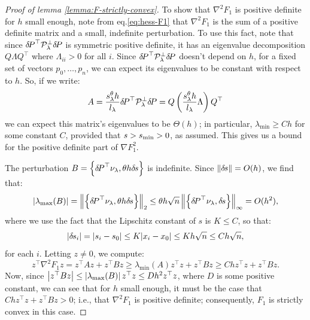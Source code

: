 \documentclass[smallcondensed]{svjour3}
\begin{document}
\begin{proof}[Proof of lemma \ref{lemma:F-strictly-convex}]
  To show that $\nabla^2 F_1$ is positive definite for $h$ small
  enough, note from eq.\@ \ref{eq:hess-F1} that $\nabla^2 F_1$ is
  the sum of a positive definite matrix and a small, indefinite
  perturbation. To use this fact, note that since
  ${\delta \hspace{-0.14em} P}^\top \mathcal{P}^\perp_\lambda {\delta \hspace{-0.14em} P}$ is symmetric positive
  definite, it has an eigenvalue decomposition $Q \Lambda Q^\top$
  where $\Lambda_{ii} > 0$ for all $i$. Since
  ${\delta \hspace{-0.14em} P}^\top \mathcal{P}^\perp_\lambda {\delta \hspace{-0.14em} P}$ doesn't depend on $h$,
  for a fixed set of vectors $p_0, \hdots, p_n$, we can expect its
  eigenvalues to be constant with respect to $h$. So, if we write:
  \begin{equation}
    A = \frac{s^\theta_\lambda h}{l_\lambda} {\delta \hspace{-0.14em} P}^\top \mathcal{P}^\perp_\lambda {\delta \hspace{-0.14em} P} = Q \left(\frac{s^\theta_\lambda h}{l_\lambda} \Lambda\right) Q^\top
  \end{equation}
  we can expect this matrix's eigenvalues to be $\Theta(h)$; in
  particular, $\lambda_{\min} \geq C h$ for some constant $C$,
  provided that $s > s_{\operatorname{min}} > 0$, as assumed. This gives us a bound for
  the positive definite part of $\nabla F_1^2$.

  The perturbation $B = \left\{{\delta \hspace{-0.14em} P}^\top \nu_\lambda, \theta h {\delta \hspace{-0.1em} s}\right\}$
  is indefinite. Since $\left\|{\delta \hspace{-0.1em} s}\right\| = O(h)$, we find that:
  \begin{equation}
    |\lambda_{\max}(B)| = \left\|\left\{{\delta \hspace{-0.14em} P}^\top \nu_\lambda,
        \theta h {\delta \hspace{-0.1em} s}\right\}\right\|_2 \leq \theta h \sqrt{n} \left\|\left\{{\delta \hspace{-0.14em} P}^\top \nu_\lambda, {\delta \hspace{-0.1em} s}\right\}\right\|_\infty = O(h^2),
  \end{equation}
  where we use the fact that the Lipschitz constant of $s$ is
  $K \leq C$, so that:
  \begin{equation}
    |{\delta \hspace{-0.1em} s}_i| = |s_i - s_0| \leq K |x_i - x_0| \leq K h \sqrt{n}
    \leq Ch \sqrt{n},
  \end{equation}
  for each $i$. Letting $z \neq 0$, we compute:
  \begin{equation}
    z^\top \nabla^2 F_1 z = z^\top A z + z^\top B z \geq \lambda_{\min}(A) z^\top z + z^\top B z \geq Ch z^\top z + z^\top B z.
  \end{equation}
  Now, since
  $\left|z^\top B z\right| \leq \left|\lambda_{\max}(B)\right| z^\top z \leq D h^2
  z^\top z$, where $D$ is some positive constant, we can see that for
  $h$ small enough, it must be the case that
  $Ch z^\top z + z^\top B z > 0$; i.e., that $\nabla^2 F_1$ is
  positive definite; consequently, $F_1$ is strictly convex in this case.
\end{proof}
\end{document}
